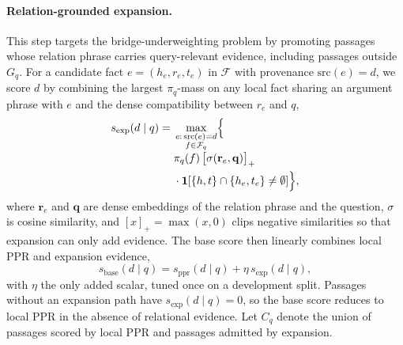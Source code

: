\paragraph{Relation-grounded expansion.}
This step targets the bridge-underweighting problem by promoting
passages whose relation phrase carries query-relevant evidence,
including passages outside $G_q$. For a candidate fact
$e=(h_e, r_e, t_e)$ in $\mathcal{F}$ with provenance
$\mathrm{src}(e)=d$, we score $d$ by combining the largest
$\pi_q$-mass on any local fact sharing an argument phrase with $e$
and the dense compatibility between $r_e$ and $q$,
\begin{equation}
\label{eq:expansion-score}
\begin{aligned}
s_{\mathrm{exp}}(d \mid q)
= {}& \max_{\substack{e:\,\mathrm{src}(e)=d \\ f \in \mathcal{F}_q}}
\Bigl\{\\[-0.3em]
&\pi_q(f)\,\bigl[\sigma(\mathbf{r}_e,\mathbf{q})\bigr]_{+}\\
&{}\cdot\mathbf{1}\!\left[
\{h,t\}\cap\{h_e,t_e\}\neq\emptyset
\right]\Bigr\},
\end{aligned}
\end{equation}
where $\mathbf{r}_e$ and $\mathbf{q}$ are dense embeddings of the
relation phrase and the question, $\sigma$ is cosine similarity, and
$[x]_{+}=\max(x,0)$ clips negative similarities so that expansion can
only add evidence. The base score then linearly combines local PPR
and expansion evidence,
\begin{equation}
\label{eq:base-score}
s_{\mathrm{base}}(d \mid q)
=
s_{\mathrm{ppr}}(d \mid q)
+
\eta\,s_{\mathrm{exp}}(d \mid q),
\end{equation}
with $\eta$ the only added scalar, tuned once on a development split.
Passages without an expansion path have
$s_{\mathrm{exp}}(d \mid q)=0$, so the base score reduces to local PPR
in the absence of relational evidence. Let $C_q$ denote the union of
passages scored by local PPR and passages admitted by expansion.

